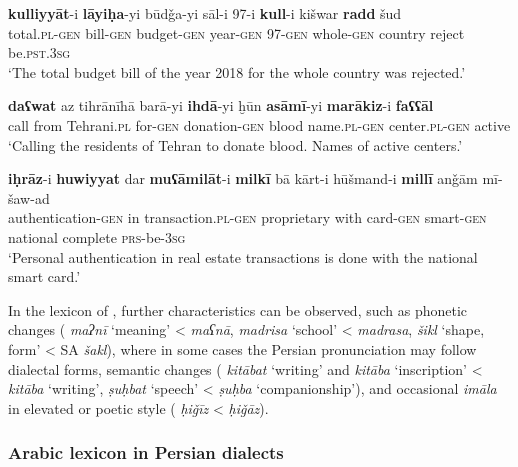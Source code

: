 \documentclass[output=paper]{langsci/langscibook}
\begin{document}
\ea
\ea
\gll \textbf{kulliyyāt}-i \textbf{lāyiḥa}-yi būdǧa-yi sāl-i 97-i \textbf{kull}-i kišwar \textbf{radd} šud\\
total.\textsc{pl-gen} bill-\textsc{gen} budget-\textsc{gen} year-\textsc{gen} 97-\textsc{gen} whole-\textsc{gen} country reject be.\textsc{pst.3sg}\\
    \glt ‘The total budget bill of the year 2018 for the whole country was rejected.’

\ex
\gll \textbf{daʕwat} {az} {tihrānīhā} barā-yi \textbf{ihdā}-yi ḫūn \textbf{asāmī}-yi \textbf{marākiz}-i \textbf{faʕʕāl}\\
call from Tehrani.\textsc{pl} for-\textsc{gen} donation-\textsc{gen} blood name.\textsc{pl-gen} center.\textsc{pl-gen} active\\
    \glt ‘Calling the residents of Tehran to donate blood. Names of active centers.’

\ex
\gll \textbf{iḥrāz}-i \textbf{huwiyyat} dar \textbf{muʕāmilāt}-i \textbf{milkī} {bā} {kārt-i} hūšmand-i \textbf{millī} {anǧām} {mī-šaw-ad}\\
authentication-\textsc{gen}  in transaction.\textsc{pl-gen} proprietary with card-\textsc{gen} smart-\textsc{gen} national complete \textsc{prs}-be-\textsc{3sg}\\
    \glt‘Personal authentication in real estate transactions is done with the national smart card.’
\z
\z


In the  lexicon of , further characteristics can be observed, such as phonetic changes ( \textit{maʔnī} ‘meaning’ <  \textit{maʕnā},  \textit{madrisa} ‘school’ <  \textit{madrasa},  \textit{šikl} ‘shape, form’ < SA \textit{šakl}), where in some cases the Persian pronunciation may follow  dialectal forms, semantic changes ( \textit{kitābat} ‘writing’ and \textit{kitāba} ‘inscription’ <  \textit{kitāba} ‘writing’,  \textit{ṣuḥbat} ‘speech’ <  \textit{ṣuḥba} ‘companionship’), and occasional \textit{imāla} in elevated or poetic style ( \textit{ḥiǧīz} <  \textit{ḥiǧāz}).

\subsubsection{Arabic lexicon in Persian dialects}
\end{document}
